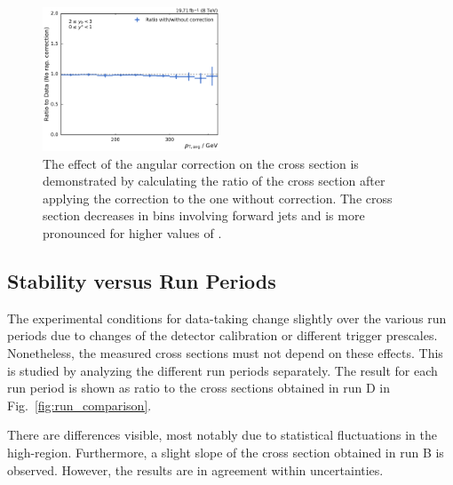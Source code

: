\begin{figure}[htbp]
    \includegraphics[width=0.47\textwidth]{figures/measurement/rap_corr_data_yb2ys0.pdf}
    \caption[Effect of angular correction]{The effect of the angular correction
        on the cross section  is demonstrated by calculating the ratio of the
        cross section after applying the correction to the one without
        correction. The cross section decreases in bins involving forward jets
        and is more pronounced for higher values of \ystar.}
    \label{fig:rap_corr_data}
\end{figure}

\subsection{Stability versus Run Periods}

The experimental conditions for data-taking change slightly over the various run
periods due to changes of the detector calibration or different trigger
prescales. Nonetheless, the measured cross sections must not depend on
these effects. This is studied by analyzing the different run periods
separately. The result for each run period is shown as ratio to the cross
sections obtained in run D in Fig.~\ref{fig:run_comparison}. 

There are differences visible, most notably due to statistical fluctuations in the
high-\pt region. Furthermore, a slight slope of the cross section obtained in run
B is observed. However, the results are in agreement within uncertainties.


